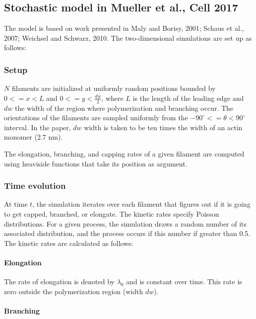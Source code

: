 \documentclass[11pt]{article}
\begin{document}
    \subsection{Stochastic model in Mueller et al., Cell
2017}\label{stochastic-model-in-mueller-et-al.-cell-2017}

The model is based on work presented in Maly and Borisy, 2001; Schaus et
al., 2007; Weichsel and Schwarz, 2010. The two-dimensional simulations
are set up as follows:

\subsubsection{Setup}\label{setup}

\(N\) filaments are initialized at uniformly random positions bounded by
\(0 <= x < L\) and \(0 <= y < \frac{dw}{2}\), where \(L\) is the length
of the leading edge and \(dw\) the width of the region where
polymerization and branching occur. The orientations of the filaments
are sampled uniformly from the \(-90^\circ <= \theta < 90^\circ\)
interval. In the paper, \(dw\) width is taken to be ten times the width
of an actin monomer (2.7 nm).

The elongation, branching, and capping rates of a given filament are
computed using heaviside functions that take its position as argument.

\subsubsection{Time evolution}\label{time-evolution}

At time \(t\), the simulation iterates over each filament that figures
out if it is going to get capped, branched, or elongate. The kinetic
rates specify Poisson distributions. For a given process, the simulation
draws a random number of its associated distribution, and the process
occurs if this number if greater than 0.5. The kinetic rates are
calculated as follows:

\paragraph{Elongation}\label{elongation}

The rate of elongation is denoted by \(\lambda_0\) and is constant over
time. This rate is zero outside the polymerization region (width
\(dw\)).

\paragraph{Branching}\label{branching}
\end{document}
